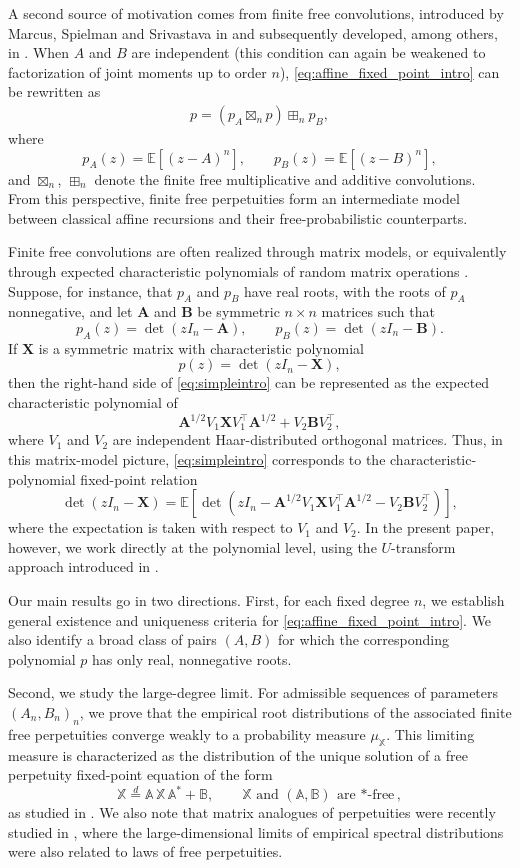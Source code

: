 \documentclass[a4paper,11pt]{amsart}
\numberwithin{equation}{section}
\newcommand{\E}{\mathbb{E}}
\def \X {{\mathbb X}}
\def \A {{\mathbb A}}
\def \B {{\mathbb B}}
\begin{document}
A second source of motivation comes from finite free convolutions, introduced by Marcus, Spielman and Srivastava in \cite{MSS} and subsequently developed, among others, in \cite{AP18,AGP23,AFPU24,Fujie25}.
When \(A\) and \(B\) are independent (this condition can again be  weakened to factorization of joint moments up to order $n$), \eqref{eq:affine_fixed_point_intro} can be rewritten as
\begin{align}\label{eq:simpleintro}
p=(p_A\boxtimes_n p)\boxplus_n p_B,
\end{align}
where
\[
p_A(z)=\E[(z-A)^n],
\qquad
p_B(z)=\E[(z-B)^n],
\]
and \(\boxtimes_n\), \(\boxplus_n\) denote the finite free multiplicative and additive convolutions.
From this perspective, finite free perpetuities form an intermediate model between classical affine recursions and their free-probabilistic counterparts.


Finite free convolutions are often realized through matrix models, or equivalently through expected characteristic polynomials of random matrix operations \cite{MSS,Mar21}. Suppose, for instance, that $p_A$ and $p_B$ have real roots, with the roots of $p_A$ nonnegative, and let $\mathbf A$ and $\mathbf B$ be symmetric $n\times n$ matrices such that
\[
p_A(z)=\det(zI_n-\mathbf A),
\qquad
p_B(z)=\det(zI_n-\mathbf B).
\]
If $\mathbf X$ is a symmetric matrix with characteristic polynomial
\[
p(z)=\det(zI_n-\mathbf X),
\]
then the right-hand side of \eqref{eq:simpleintro} can be represented as the expected characteristic polynomial of 
\[
\mathbf A^{1/2}V_1\mathbf XV_1^\top \mathbf A^{1/2}
+
V_2\mathbf BV_2^\top,
\]
where $V_1$ and $V_2$ are independent Haar-distributed orthogonal matrices. Thus, in this matrix-model picture, \eqref{eq:simpleintro} corresponds to the characteristic-polynomial fixed-point relation
\[
\det(zI_n-\mathbf X)
=
\E\left[\det\left(
zI_n-
\mathbf A^{1/2}V_1\mathbf XV_1^\top \mathbf A^{1/2}-
V_2\mathbf BV_2^\top
\right)\right],
\]
where the expectation is taken with respect to $V_1$ and $V_2$. 
In the present paper, however, we work directly at the polynomial level, using the $U$-transform approach introduced in \cite{Mar21}.

Our main results go in two directions.
First, for each fixed degree $n$, we establish general existence and uniqueness criteria for \eqref{eq:affine_fixed_point_intro}. We also  identify a broad class of pairs $(A,B)$ for which the corresponding polynomial $p$ has only real, nonnegative roots.

Second, we study the large-degree limit. For admissible sequences of parameters $(A_n,B_n)_n$, we prove that the empirical root distributions of the associated finite free perpetuities converge weakly to a probability measure $\mu_{\X}$. This limiting measure is characterized as the distribution of the unique solution of a free perpetuity fixed-point equation of the form
\[
\X \stackrel{d}{=} \A\, \X \,\A^\ast + \B,
\qquad \X\mbox{ and }
(\A,\B)\ \text{are $*$-free},
\]
as studied in \cite{FreePerp}. We also note that matrix analogues of perpetuities were recently studied in \cite{MatrixPerp}, where the large-dimensional limits of empirical spectral distributions were also related to laws of free perpetuities. 
\end{document}
